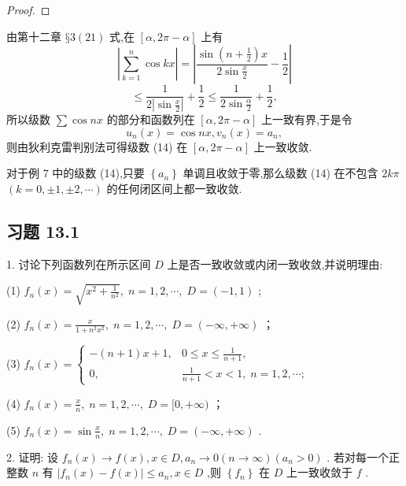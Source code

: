\begin{proof}

\end{proof}
由第十二章 \(§3\left( {21}\right)\) 式,在 \(\left\lbrack  {\alpha ,{2\pi } - \alpha }\right\rbrack\) 上有
\[
\left| {\mathop{\sum }\limits_{{k = 1}}^{n}\cos {kx}}\right|  = \left| {\frac{\sin \left( {n + \frac{1}{2}}\right) x}{2\sin \frac{x}{2}} - \frac{1}{2}}\right|
\]
\[
\leq  \frac{1}{2\left| {\sin \frac{x}{2}}\right| } + \frac{1}{2} \leq  \frac{1}{2\sin \frac{\alpha }{2}} + \frac{1}{2},
\]
所以级数 \(\sum \cos {nx}\) 的部分和函数列在 \(\left\lbrack  {\alpha ,{2\pi } - \alpha }\right\rbrack\) 上一致有界,于是令
\[
{u}_{n}\left( x\right)  = \cos {nx},{v}_{n}\left( x\right)  = {a}_{n},
\]
则由狄利克雷判别法可得级数 (14) 在 \(\left\lbrack  {\alpha ,{2\pi } - \alpha }\right\rbrack\) 上一致收敛.

对于例 7 中的级数 (14),只要 \(\left\{  {a}_{n}\right\}\) 单调且收敛于零,那么级数 (14) 在不包含 \({2k\pi }\)  \(\left( {k = 0, \pm  1, \pm  2,\cdots }\right)\) 的任何闭区间上都一致收敛.

\subsection{习题 13.1}

1. 讨论下列函数列在所示区间 \(D\) 上是否一致收敛或内闭一致收敛,并说明理由:

(1) \({f}_{n}\left( x\right)  = \sqrt{{x}^{2} + \frac{1}{{n}^{2}}},\;n = 1,2,\cdots ,\;D = \left( {-1,1}\right)\) ;

(2) \({f}_{n}\left( x\right)  = \frac{x}{1 + {n}^{2}{x}^{2}},\;n = 1,2,\cdots ,\;D = \left( {-\infty , + \infty }\right)\) ；

(3) \({f}_{n}\left( x\right)  = \left\{  \begin{array}{ll}  - \left( {n + 1}\right) x + 1, & 0 \leq  x \leq  \frac{1}{n + 1}, \\  0, & \frac{1}{n + 1} < x < 1,\;n = 1,2,\cdots ; \end{array}\right.\)

(4) \({f}_{n}\left( x\right)  = \frac{x}{n},\;n = 1,2,\cdots ,\;D = \lbrack 0, + \infty )\) ；

(5) \({f}_{n}\left( x\right)  = \sin \frac{x}{n},\;n = 1,2,\cdots ,\;D = \left( {-\infty , + \infty }\right)\) .

2. 证明: 设 \({f}_{n}\left( x\right)  \rightarrow  f\left( x\right) ,x \in  D,{a}_{n} \rightarrow  0\left( {n \rightarrow  \infty }\right) \left( {{a}_{n} > 0}\right)\) . 若对每一个正整数 \(n\) 有 \(\left| {{f}_{n}\left( x\right)  - f\left( x\right) }\right|  \leq  {a}_{n},x \in  D\) ,则 \(\left\{  {f}_{n}\right\}\) 在 \(D\) 上一致收敛于 \(f\) .

